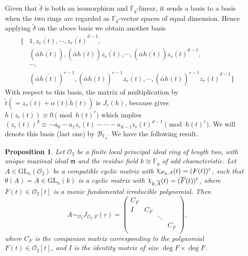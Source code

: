 \documentclass[11pt,twoside]{amsart}
\newcommand{\GL}{\mathrm{GL}}
\newcommand{\upchi}{\raisebox{0.4ex}{$\chi$}}
\newcommand{\Char}{\upchi}
\newcommand{\R}{\mathscr{O}_2}
\newcommand{\Fq}{\mathbb{F}_q}
\newtheorem{proposition}[lemma]{Proposition}
\theoremstyle{definition} %
\begin{document}
Given that $\tilde{\delta}$ is both an isomorphism and $\mathbb{F}_q$-linear, it sends a basis to a basis when the two rings are regarded as $\mathbb{F}_q$-vector spaces of equal dimension.
Hence applying $\tilde{\delta}$ on the above basis we obtain another basis 
\begin{align*}
\{&1, \overline{z_r(t)},\cdots,\overline{z_r(t)}^{d-1},\\&(\bar{\alpha}\overline{h(t)}),(\bar{\alpha}\overline{h(t)})\overline{z_r(t)},\cdots,(\bar{\alpha}\overline{h(t)})\overline{z_r(t)}^{d-1},\\
&\cdots,\\
&(\bar{\alpha}\overline{h(t)})^{r-1}, (\bar{\alpha}\overline{h(t)})^{r-1}\overline{z_r(t)},\cdots,(\bar{\alpha}\overline{h(t)})^{r-1}\overline{z_r(t)}^{d-1}\}    
\end{align*}
With respect to this basis, the matrix of multiplication by $\tilde{t}(=\overline{z_r(t)}+\overline{\alpha(t)h(t)})$ is $J_r(h)$, because  gives $h(z_r(t))\equiv 0\pmod{h(t)^r}$ which implies $(z_r(t))^d\equiv-a_0-a_1z_r(t)-\cdots-a_{d-1}z_r(t)^{d-1} \pmod{h(t)^r}$.
We will denote this basis (last one) by $\mathscr{B}_{\mathbb{F}_q}$. We have the following result. 
\begin{proposition}\label{prop-canonical-form-type}
Let $\R$ be a finite local principal ideal ring of length two, with unique maximal ideal $\mathfrak{m}$ and the residue field $k\cong\Fq$ of odd characteristic. 
Let $A\in \GL_n(\R)$ be a compatible cyclic matrix with $\Char_{\R,A}(t)=(F(t))^r$, such that $\theta(A)=\overline{A}\in \GL_n(k)$ is a cyclic matrix with $\Char_{k,\overline{A}}(t)=(\overline{F}(t))^r$, where $F(t)\in\R[t]$ is a monic fundamental irreducible polynomial. Then $$ A\sim_{\R} J_{\R,F}(r)=\begin{pmatrix}
C_F &  &   &      \\
 I & C_F &  &      \\
  &   & \ddots   &   \\
  &   &   & C_F  \\
\end{pmatrix},$$ where $C_F$ is the companion matrix corresponding to the polynomial $F(t)\in \R[t]$, and $I$ is the identity matrix of size $\deg F\times \deg F$.
\end{proposition}
\end{document}
